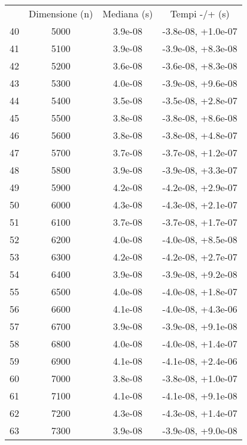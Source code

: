 \begin{table}
\centering
\begin{adjustbox}{width=1\textwidth/2}
\begin{tabular}{|c|c|c|c|}
\hline
 & Dimensione (n) & Mediana (s) & Tempi -/+ (s) \\
40 & 5000 & 3.9e-08 & -3.8e-08, +1.0e-07 \\
\cline{1-4}
41 & 5100 & 3.9e-08 & -3.9e-08, +8.3e-08 \\
\cline{1-4}
42 & 5200 & 3.6e-08 & -3.6e-08, +8.3e-08 \\
\cline{1-4}
43 & 5300 & 4.0e-08 & -3.9e-08, +9.6e-08 \\
\cline{1-4}
44 & 5400 & 3.5e-08 & -3.5e-08, +2.8e-07 \\
\cline{1-4}
45 & 5500 & 3.8e-08 & -3.8e-08, +8.6e-08 \\
\cline{1-4}
46 & 5600 & 3.8e-08 & -3.8e-08, +4.8e-07 \\
\cline{1-4}
47 & 5700 & 3.7e-08 & -3.7e-08, +1.2e-07 \\
\cline{1-4}
48 & 5800 & 3.9e-08 & -3.9e-08, +3.3e-07 \\
\cline{1-4}
49 & 5900 & 4.2e-08 & -4.2e-08, +2.9e-07 \\
\cline{1-4}
50 & 6000 & 4.3e-08 & -4.3e-08, +2.1e-07 \\
\cline{1-4}
51 & 6100 & 3.7e-08 & -3.7e-08, +1.7e-07 \\
\cline{1-4}
52 & 6200 & 4.0e-08 & -4.0e-08, +8.5e-08 \\
\cline{1-4}
53 & 6300 & 4.2e-08 & -4.2e-08, +2.7e-07 \\
\cline{1-4}
54 & 6400 & 3.9e-08 & -3.9e-08, +9.2e-08 \\
\cline{1-4}
55 & 6500 & 4.0e-08 & -4.0e-08, +1.8e-07 \\
\cline{1-4}
56 & 6600 & 4.1e-08 & -4.0e-08, +4.3e-06 \\
\cline{1-4}
57 & 6700 & 3.9e-08 & -3.9e-08, +9.1e-08 \\
\cline{1-4}
58 & 6800 & 4.0e-08 & -4.0e-08, +1.4e-07 \\
\cline{1-4}
59 & 6900 & 4.1e-08 & -4.1e-08, +2.4e-06 \\
\cline{1-4}
60 & 7000 & 3.8e-08 & -3.8e-08, +1.0e-07 \\
\cline{1-4}
61 & 7100 & 4.1e-08 & -4.1e-08, +9.1e-08 \\
\cline{1-4}
62 & 7200 & 4.3e-08 & -4.3e-08, +1.4e-07 \\
\cline{1-4}
63 & 7300 & 3.9e-08 & -3.9e-08, +9.0e-08 \\

\end{tabular}
\end{adjustbox}
\end{table}
